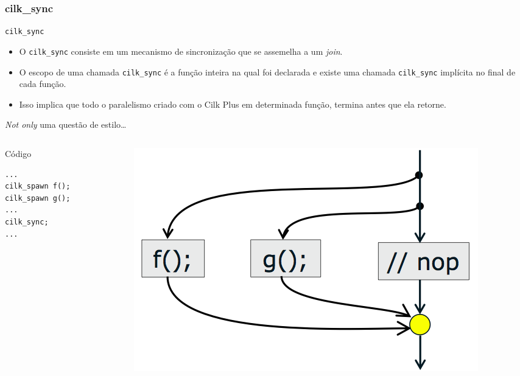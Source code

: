 \documentclass{beamer}
\begin{document}
\subsubsection{cilk\_sync}
\begin{frame}{\texttt{cilk\_sync}}
\begin{itemize}
    \item O \texttt{cilk\_sync} consiste em um mecanismo de sincronização que se
    assemelha a um \textit{join}.
    \item O escopo de uma chamada \texttt{cilk\_sync} é a função inteira na qual
    foi declarada e existe uma chamada \texttt{cilk\_sync} implícita no final de
    cada função.
    \item Isso implica que todo o paralelismo criado com o Cilk Plus em
    determinada função, termina antes que ela retorne.
\end{itemize}
\end{frame}

\begin{frame}[fragile]{\emph{Not only} uma questão de estilo\ldots}
\begin{columns}[c]

\begin{column}{0.3\textwidth}
\begin{block}{Código}
\begin{lstlisting}
...
cilk_spawn f();
cilk_spawn g();
...
cilk_sync;
...
\end{lstlisting}
\end{block}
\end{column}

\pause

\begin{column}{0.6\textwidth}
\begin{figure}
    \centering
    \includegraphics[width=\columnwidth]{./img/bad-style.png}
\end{figure}
\end{column}
\end{columns}
\end{frame}
\end{document}
